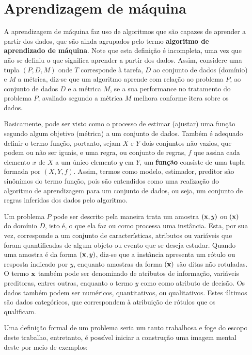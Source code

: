 \section{Aprendizagem de máquina}

A aprendizagem de máquina faz uso de algoritmos que são capazes de aprender a partir dos dados, que são ainda agrupados pelo termo {\bf algoritmo de aprendizado de máquina}. Note que esta definição é incompleta, uma vez que não se definiu o que significa aprender a partir dos dados. Assim, considere uma tupla $(P, D, M)$ onde $T$ corresponde à tarefa, $D$ ao conjunto de dados (domínio) e $M$ a métrica, diz-se que um algoritmo aprende com relação ao problema $P$, ao conjunto de dados $D$ e a métrica $M$, se a sua performance no tratamento do problema $P$, avaliado segundo a métrica $M$ melhora conforme itera sobre os dados. 

Basicamente, pode ser visto como o processo de estimar (ajustar) uma função segundo algum objetivo (métrica) a um conjunto de dados. Também é adequado definir o termo função, portanto, sejam $X$ e $Y$ dois conjuntos não vazios, que podem ou não ser iguais, e uma regra, ou conjunto de regras, $f$ que assina cada elemento $x$ de $X$ a um único elemento $y$ em $Y$, um {\bf função} consiste de uma tupla formada por $(X, Y, f)$. Assim, termos como modelo, estimador, preditor são sinônimos do termo função, pois são entendidos como uma realização do algoritmo de aprendizagem para um conjunto de dados, ou seja, um conjunto de regras inferidas dos dados pelo algoritmo.

Um problema $P$ pode ser descrito pela maneira trata um amostra $({\bf x}, y)$ ou $({\bf x})$ do domínio $D$, isto é, o que ela faz ou como processa uma instância. Esta, por sua vez, corresponde a um conjunto de características, atributos ou variáveis que foram quantificadas de algum objeto ou evento que se deseja estudar. Quando uma amostra é da forma $({\bf x}, y)$, diz-se que a instância apresenta um rótulo ou resposta indicado por $y$, enquanto amostras da forma $({\bf x})$ são ditas não rotuladas. O termo ${\bf x}$ também pode ser denominado de atributos de informação, variáveis preditoras, entres outras, enquanto o termo $y$ como como atributo de decisão. Os dados também podem ser numéricos, quantitativos, ou qualitativos. Estes últimos são dados categóricos, que correspondem à atribuição de rótulos que os qualificam.

Uma definição formal de um problema seria um tanto trabalhosa e foge do escopo deste trabalho, entretanto, é possível iniciar a construção uma imagem mental deste por meio de exemplos:


